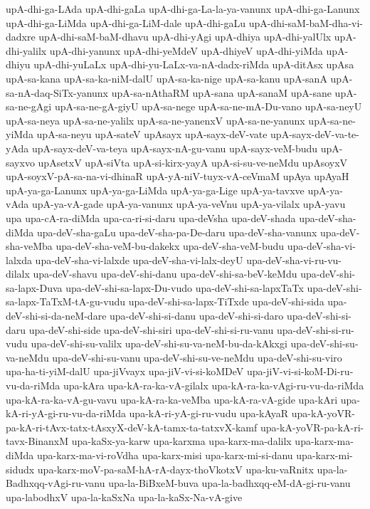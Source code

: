 {upA-dhi-ga-LAda
upA-dhi-gaLa
upA-dhi-ga-La-la-ya-vanunx
upA-dhi-ga-Lanunx
upA-dhi-ga-LiMda
upA-dhi-ga-LiM-dale
upA-dhi-gaLu
upA-dhi-saM-baM-dha-vi-dadxre
upA-dhi-saM-baM-dhavu
upA-dhi-yAgi
upA-dhiya
upA-dhi-yalUlx
upA-dhi-yalilx
upA-dhi-yanunx
upA-dhi-yeMdeV
upA-dhiyeV
upA-dhi-yiMda
upA-dhiyu
upA-dhi-yuLaLx
upA-dhi-yu-LaLx-va-nA-dadx-riMda
upA-ditAsx
upAsa
upA-sa-kana
upA-sa-ka-niM-dalU
upA-sa-ka-nige
upA-sa-kanu
upA-sanA
upA-sa-nA-daq-SiTx-yanunx
upA-sa-nAthaRM
upA-sana
upA-sanaM
upA-sane
upA-sa-ne-gAgi
upA-sa-ne-gA-giyU
upA-sa-nege
upA-sa-ne-mA-Du-vano
upA-sa-neyU
upA-sa-neya
upA-sa-ne-yalilx
upA-sa-ne-yanenxV
upA-sa-ne-yanunx
upA-sa-ne-yiMda
upA-sa-neyu
upA-sateV
upAsayx
upA-sayx-deV-vate
upA-sayx-deV-va-te-yAda
upA-sayx-deV-va-teya
upA-sayx-nA-gu-vanu
upA-sayx-veM-budu
upA-sayxvo
upAsetxV
upA-siVta
upA-si-kirx-yayA
upA-si-su-ve-neMdu
upAsoyxV
upA-soyxV-pA-sa-na-vi-dhinaR
upA-yA-niV-tuyx-vA-ceVmaM
upAya
upAyaH
upA-ya-ga-Lanunx
upA-ya-ga-LiMda
upA-ya-ga-Lige
upA-ya-tavxve
upA-ya-vAda
upA-ya-vA-gade
upA-ya-vanunx
upA-ya-veVnu
upA-ya-vilalx
upA-yavu
upa
upa-cA-ra-diMda
upa-ca-ri-si-daru
upa-deVsha
upa-deV-shada
upa-deV-sha-diMda
upa-deV-sha-gaLu
upa-deV-sha-pa-De-daru
upa-deV-sha-vanunx
upa-deV-sha-veMba
upa-deV-sha-veM-bu-dakekx
upa-deV-sha-veM-budu
upa-deV-sha-vi-lalxda
upa-deV-sha-vi-lalxde
upa-deV-sha-vi-lalx-deyU
upa-deV-sha-vi-ru-vu-dilalx
upa-deV-shavu
upa-deV-shi-danu
upa-deV-shi-sa-beV-keMdu
upa-deV-shi-sa-lapx-Duva
upa-deV-shi-sa-lapx-Du-vudo
upa-deV-shi-sa-lapxTaTx
upa-deV-shi-sa-lapx-TaTxM-tA-gu-vudu
upa-deV-shi-sa-lapx-TiTxde
upa-deV-shi-sida
upa-deV-shi-si-da-neM-dare
upa-deV-shi-si-danu
upa-deV-shi-si-daro
upa-deV-shi-si-daru
upa-deV-shi-side
upa-deV-shi-siri
upa-deV-shi-si-ru-vanu
upa-deV-shi-si-ru-vudu
upa-deV-shi-su-valilx
upa-deV-shi-su-va-neM-bu-da-kAkxgi
upa-deV-shi-su-va-neMdu
upa-deV-shi-su-vanu
upa-deV-shi-su-ve-neMdu
upa-deV-shi-su-viro
upa-ha-ti-yiM-dalU
upa-jiVvayx
upa-jiV-vi-si-koMDeV
upa-jiV-vi-si-koM-Di-ru-vu-da-riMda
upa-kAra
upa-kA-ra-ka-vA-gilalx
upa-kA-ra-ka-vAgi-ru-vu-da-riMda
upa-kA-ra-ka-vA-gu-vavu
upa-kA-ra-ka-veMba
upa-kA-ra-vA-gide
upa-kAri
upa-kA-ri-yA-gi-ru-vu-da-riMda
upa-kA-ri-yA-gi-ru-vudu
upa-kAyaR
upa-kA-yoVR-pa-kA-ri-tAvx-tatx-tAsxyX-deV-kA-tamx-ta-tatxvX-kamf
upa-kA-yoVR-pa-kA-ri-tavx-BinanxM
upa-kaSx-ya-karw
upa-karxma
upa-karx-ma-dalilx
upa-karx-ma-diMda
upa-karx-ma-vi-roVdha
upa-karx-misi
upa-karx-mi-si-danu
upa-karx-mi-sidudx
upa-karx-moV-pa-saM-hA-rA-dayx-thoVkotxV
upa-ku-vaRnitx
upa-la-Badhxqq-vAgi-ru-vanu
upa-la-BiBxeM-buva
upa-la-badhxqq-eM-dA-gi-ru-vanu
upa-labodhxV
upa-la-kaSxNa
upa-la-kaSx-Na-vA-give
}
